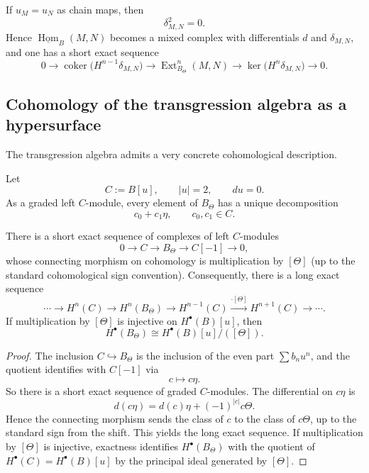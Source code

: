 \begin{corollary}
\label{cor:tholog-equal-secondary-sector}
If \(u_{M}=u_{N}\) as chain maps, then
\[
\delta_{M,N}^{2}=0.
\]
Hence \(\underline{\operatorname{Hom}}_{B}(M,N)\) becomes a mixed complex with differentials \(d\) and \(\delta_{M,N}\), and one has a short exact sequence
\[
0\longrightarrow
\operatorname{coker}\!\big(H^{n-1}\delta_{M,N}\big)
\longrightarrow
\operatorname{Ext}^{n}_{B_{\Theta}}(M,N)
\longrightarrow
\ker\!\big(H^{n}\delta_{M,N}\big)
\longrightarrow 0.
\]
\end{corollary}

\subsection{Cohomology of the transgression algebra as a hypersurface}
\label{subsec:tholog-hypersurface}

The transgression algebra admits a very concrete cohomological description.

Let
\[
C:=B[u],\qquad |u|=2,\qquad du=0.
\]
As a graded left \(C\)-module, every element of \(B_{\Theta}\) has a unique decomposition
\[
c_{0}+c_{1}\eta,
\qquad c_{0},c_{1}\in C.
\]

\begin{theorem}
\label{thm:tholog-hypersurface}
There is a short exact sequence of complexes of left \(C\)-modules
\[
0\longrightarrow C
\longrightarrow B_{\Theta}
\longrightarrow C[-1]
\longrightarrow 0,
\]
whose connecting morphism on cohomology is multiplication by \([\Theta]\) (up to the standard cohomological sign convention).
Consequently, there is a long exact sequence
\[
\cdots\to
H^{n}(C)\to H^{n}(B_{\Theta})\to H^{n-1}(C)
\xrightarrow{\cdot[\Theta]}
H^{n+1}(C)\to\cdots.
\]
If multiplication by \([\Theta]\) is injective on \(H^{\bullet}(B)[u]\), then
\[
H^{\bullet}(B_{\Theta})\cong H^{\bullet}(B)[u]/([\Theta]).
\]
\end{theorem}

\begin{proof}
The inclusion \(C\hookrightarrow B_{\Theta}\) is the inclusion of the even part \(\sum b_{n}u^{n}\), and the quotient identifies with \(C[-1]\) via
\[
c\longmapsto c\eta.
\]
So there is a short exact sequence of graded \(C\)-modules.
The differential on \(c\eta\) is
\[
d(c\eta)=d(c)\eta+(-1)^{|c|}c\Theta.
\]
Hence the connecting morphism sends the class of \(c\) to the class of \(c\Theta\), up to the standard sign from the shift.
This yields the long exact sequence.
If multiplication by \([\Theta]\) is injective, exactness identifies \(H^{\bullet}(B_{\Theta})\) with the quotient of \(H^{\bullet}(C)=H^{\bullet}(B)[u]\) by the principal ideal generated by \([\Theta]\).
\end{proof}


